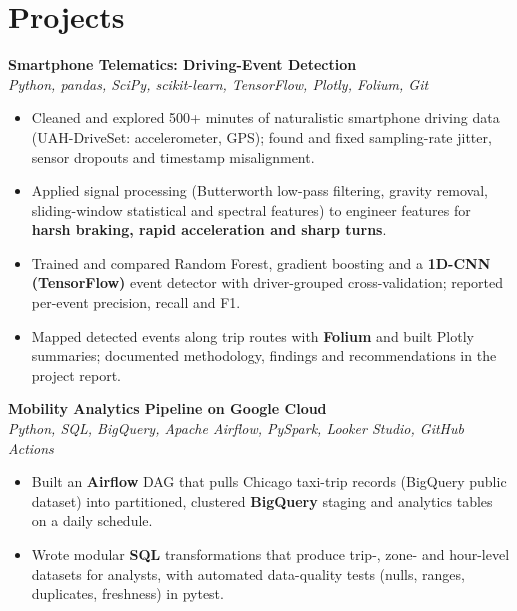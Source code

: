 \documentclass[10pt,letterpaper]{article}
\newcommand{\project}[2]{\textbf{#1}\\\textit{#2}\par}
\begin{document}
\section*{Projects}
\project{Smartphone Telematics: Driving-Event Detection}{Python, pandas, SciPy, scikit-learn, TensorFlow, Plotly, Folium, Git}
\begin{itemize}\item Cleaned and explored 500+ minutes of naturalistic smartphone driving data (UAH-DriveSet: accelerometer, GPS); found and fixed sampling-rate jitter, sensor dropouts and timestamp misalignment.\item Applied signal processing (Butterworth low-pass filtering, gravity removal, sliding-window statistical and spectral features) to engineer features for \textbf{harsh braking, rapid acceleration and sharp turns}.\item Trained and compared Random Forest, gradient boosting and a \textbf{1D-CNN (TensorFlow)} event detector with driver-grouped cross-validation; reported per-event precision, recall and F1.\item Mapped detected events along trip routes with \textbf{Folium} and built Plotly summaries; documented methodology, findings and recommendations in the project report.\end{itemize}\vspace{2pt}
\project{Mobility Analytics Pipeline on Google Cloud}{Python, SQL, BigQuery, Apache Airflow, PySpark, Looker Studio, GitHub Actions}
\begin{itemize}\item Built an \textbf{Airflow} DAG that pulls Chicago taxi-trip records (BigQuery public dataset) into partitioned, clustered \textbf{BigQuery} staging and analytics tables on a daily schedule.\item Wrote modular \textbf{SQL} transformations that produce trip-, zone- and hour-level datasets for analysts, with automated data-quality tests (nulls, ranges, duplicates, freshness) in pytest.\end{itemize}\vspace{2pt}
\end{document}
